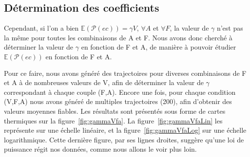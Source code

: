 	\subsection{Détermination des coefficients}
	Cependant, si l'on a bien $\mathbb{E}(\mathcal{P}(ec)) = \gamma{}V$, $\forall A$ et $\forall F$, la valeur de $\gamma$ n'est pas la même pour toutes les combinaisons de A et F. Nous avons donc cherché à déterminer la valeur de $\gamma$ en fonction de F et A, de manière à pouvoir étudier $\mathbb{E}(\mathcal{P}(ec))$ en fonction de F et A.
	
	Pour ce faire, nous avons généré des trajectoires pour diverses combinaisons de F et A à de nombreuses valeurs de V, afin de déterminer la valeur de $\gamma$ correspondant à chaque couple (F,A). Encore une fois, pour chaque condition (V,F,A) nous avons généré de multiples trajectoires (200), afin d'obtenir des valeurs moyennes fiables. Les résultats sont présentés sous forme de cartes thermiques sur la figure~\ref{fig:gammaVfa}. La figure~\ref{fig:gammaVfaLin} les représente sur une échelle linéaire, et la figure~\ref{fig:gammaVfaLog} sur une échelle logarithmique. Cette dernière figure, par ses lignes droites, suggère qu'une loi de puissance régit nos données, comme nous allons le voir plus loin.
	

